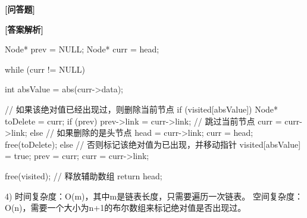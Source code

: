\documentclass[12pt,a4paper]{article}
\newenvironment{choicequestion}[1][]{%
    \vspace{0.5cm}
    \noindent\textbf{[#1]}
    \vspace{0.2cm}
}{}
\newenvironment{analysissection}{%
    \vspace{0.2cm}
    \noindent\textbf{[答案解析]}\\
    \vspace{0.1cm}
}{}
\begin{document}
\begin{choicequestion}[问答题]
\begin{analysissection}
{    Node* prev = NULL;
    Node* curr = head;
    
    while (curr != NULL) {
        int absValue = abs(curr->data);
        
        // 如果该绝对值已经出现过，则删除当前节点
        if (visited[absValue]) {
            Node* toDelete = curr;
            if (prev) {
                prev->link = curr->link;  // 跳过当前节点
                curr = curr->link;
            } else {
                // 如果删除的是头节点
                head = curr->link;
                curr = head;
            }
            free(toDelete);
        } else {
            // 否则标记该绝对值为已出现，并移动指针
            visited[absValue] = true;
            prev = curr;
            curr = curr->link;
        }
    }
    
    free(visited);  // 释放辅助数组
    return head;
}

4) 时间复杂度：O(m)，其中m是链表长度，只需要遍历一次链表。
空间复杂度：O(n)，需要一个大小为n+1的布尔数组来标记绝对值是否出现过。
\end{analysissection}
\end{choicequestion}
\end{document}
